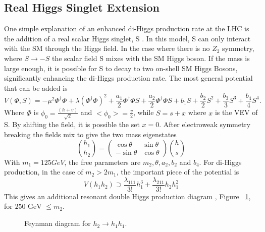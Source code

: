 \subsection{Real Higgs Singlet Extension}
One simple explanation of an enhanced di-Higgs production rate at the LHC is the addition of a real scalar Higgs singlet, S \cite{Lewis:2017dme}. In this model, S can only interact with the SM through the Higgs field. In the case where there is no ${Z_{2}}$ symmetry, where ${S\rightarrow -S}$ the scalar field S mixes with the SM Higgs boson. If the mass is large enough, it is possible for S to decay to two on-shell SM Higgs Bosons, significantly enhancing the di-Higgs production rate.\newline
\indent The most general potential that can be added is 
\begin{equation}
V(\Phi,S) = -\mu^{2}\Phi^{\dagger}\Phi + \lambda(\Phi^{\dagger}\Phi)^{2} + \frac{a_{1}}{2}\Phi^{\dagger}\Phi S + \frac{a_{2}}{2}\Phi^{\dagger}\Phi S + b_{1}S + \frac{b_{2}}{2}S^{2} + \frac{b_{3}}{3}S^{3} + \frac{b_{4}}{4}S^{4}.
\end{equation}
Where $\Phi$ is ${\phi_{0} = \frac{(h + v)}{\sqrt{2}}}$ and ${<\phi_{0}> = \frac{v}{2}}$, while ${S = s + x}$ where ${x}$ is the VEV of S. By shifting the field, it is possible the set ${x = 0}$. After electroweak symmetry breaking the fields mix to give the two mass eigenstates
\begin{equation}
\binom{h_{1}}{h_{2}} = 
\begin{pmatrix}
\cos{\theta} & \sin{\theta}\\
-\sin{\theta} & \cos{\theta}
\end{pmatrix}
\binom{h}{s}
\end{equation}
With ${m_{1} = 125 GeV}$, the free parameters are ${m_{2}, \theta,a_{2},b_{2}}$ and ${b_{4}}$. For di-Higgs production, in the case of ${m_{2}>2m_{1}}$, the important piece of the potential is 
\begin{equation}
V(h_{1}h_{2}) \supset \frac{\lambda_{111}}{3!}h_{1}^{3} + \frac{\lambda_{211}}{3!}h_{2}h_{1}^{2}
\end{equation}
This gives an additional resonant double Higgs production diagram , Figure ~\ref{fig:FeyRes}, for ${250 \text{ GeV } \leq m_{2}}$.
\begin{figure}[h]
\begin{center}
\caption[Resonant di-Higgs production diagram]{Feynman diagram for ${h_{2}\rightarrow h_{1}h_{1}}$.}
\label{fig:FeyRes}
\end{center}
\end{figure}

